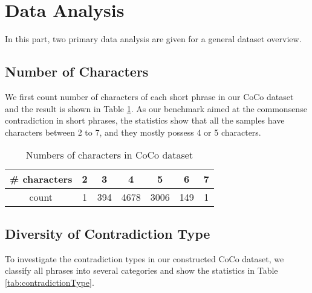 \section{Data Analysis}
In this part, two primary data analysis are given for a general dataset overview. 
\subsection{Number of Characters}
We first count number of characters of each short phrase in our CoCo dataset and the result is shown in Table \ref{tab:numCharCoCo}. %
As our benchmark aimed at the commonsense contradiction in short phrases, the statistics show that all the samples have characters between 2 to 7, and they mostly possess 4 or 5 characters. 

\begin{table}[h!]
	\small
	\centering
	\begin{tabular}{ccccccc}
		\hline
		\# characters &2&3&4&5&6&7 \\
		\hline
		count&1&394&4678&3006&149&1\\
		\hline
	\end{tabular}
	\caption{Numbers of characters in CoCo dataset}
	\label{tab:numCharCoCo}
\end{table}


\subsection{Diversity of Contradiction Type}
To investigate the contradiction types in our constructed CoCo dataset, we classify all phrases into several categories and show the statistics in Table \ref{tab:contradictionType}. 


